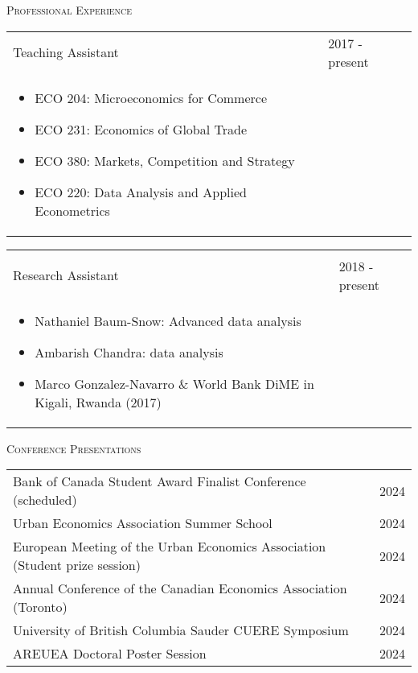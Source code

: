 \documentclass[11pt]{amsart}
\begin{document}
\vspace{0.4cm}

\LARGE
\textsc{Professional Experience}
\vspace{0.2cm}
\normalsize

\begin{tabular}{ p{12.5cm} p{5cm}}
Teaching Assistant & 2017 - present \\
\begin{itemize}
  \item ECO 204: Microeconomics for Commerce
  \item ECO 231: Economics of Global Trade
  \item ECO 380: Markets, Competition and Strategy
  \item ECO 220: Data Analysis and Applied Econometrics
\end{itemize} 
                   &                
\end{tabular}

\begin{tabular}{ p{12.5cm} p{5cm}}
                   &             \\
Research Assistant & 2018 - present \\
\begin{itemize}
  \item Nathaniel Baum-Snow: Advanced data analysis 
  \item Ambarish Chandra: data analysis
  \item Marco Gonzalez-Navarro \& World Bank DiME in Kigali, Rwanda (2017)
\end{itemize}      &             


\end{tabular}





\normalsize

\vspace{0.4cm}
\LARGE
\textsc{Conference Presentations}
\vspace{0.2cm}
\normalsize

\begin{tabular}{ p{12.5cm} p{5cm}}
Bank of Canada Student Award Finalist Conference (scheduled) & 2024 \\	
Urban Economics Association Summer School & 2024 \\	
European Meeting of the Urban Economics Association (Student prize session) &				 2024 \\
Annual Conference of the Canadian Economics Association (Toronto)     & 2024 \\
University of British Columbia Sauder CUERE Symposium                   & 2024 \\
AREUEA Doctoral Poster Session & 2024 \\
\end{tabular}
\end{document}
